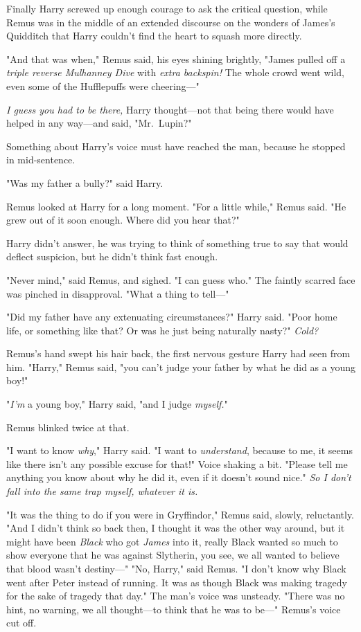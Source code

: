 Finally Harry screwed up enough courage to ask the critical question, while
Remus was in the middle of an extended discourse on the wonders of James's
Quidditch that Harry couldn't find the heart to squash more directly.

"And that was when," Remus said, his eyes shining brightly, "James pulled off a
\emph{triple reverse Mulhanney Dive} with \emph{extra backspin!} The whole
crowd went wild, even some of the Hufflepuffs were cheering\mbox{---}"

\emph{I guess you had to be there,} Harry thought---not that being there would
have helped in any way---and said, "Mr.~Lupin?"

Something about Harry's voice must have reached the man, because he stopped in
mid-sentence.

"Was my father a bully?" said Harry.

Remus looked at Harry for a long moment. "For a little while," Remus said. "He
grew out of it soon enough. Where did you hear that?"

Harry didn't answer, he was trying to think of something true to say that would
deflect suspicion, but he didn't think fast enough.

"Never mind," said Remus, and sighed. "I can guess who." The faintly scarred
face was pinched in disapproval. "What a thing to tell\mbox{---}"

"Did my father have any extenuating circumstances?" Harry said. "Poor home
life, or something like that? Or was he just{\el} being naturally
nasty?" \emph{Cold?}

Remus's hand swept his hair back, the first nervous gesture Harry had seen from
him. "Harry," Remus said, "you can't judge your father by what he did as a
young boy!"

"\emph{I'm} a young boy," Harry said, "and I judge \emph{myself.}"

Remus blinked twice at that.

"I want to know \emph{why}," Harry said. "I want to \emph{understand}, because
to me, it seems like there isn't any possible excuse for that!" Voice shaking a
bit. "Please tell me anything you know about why he did it, even if it doesn't
sound nice."  \emph{So I don't fall into the same trap myself, whatever it is.}

"It was the thing to do if you were in Gryffindor," Remus said, slowly,
reluctantly. "And{\el} I didn't think so back then, I thought it was the
other way around, but{\el} it might have been \emph{Black} who got
\emph{James} into it, really{\el} Black wanted so much to show everyone that
he was against Slytherin, you see, we all wanted to believe that blood wasn't
destiny\mbox{---}"
\sbreak
"No, Harry," said Remus. "I don't know why Black went after Peter instead of
running. It was as though Black was making tragedy for the sake of tragedy that
day." The man's voice was unsteady. "There was no hint, no warning, we all
thought---to think that he was to be\mbox{---}" Remus's voice cut off.

